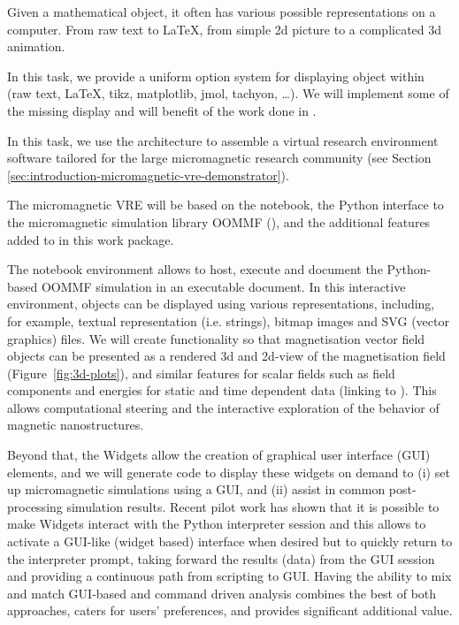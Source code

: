 \begin{workpackage}
\begin{tasklist}
\begin{task}[lead=UB,title=Common option system for various displays
  in Sage,id=Sage-display,PM=12,wphases=0-24]
  Given a mathematical object, it often has various possible
  representations on a computer. From raw text to \LaTeX, from simple
  2d picture to a complicated 3d animation.

  In this task, we provide a uniform option system for displaying
  object within \Sage (raw text, \LaTeX, tikz, matplotlib, jmol,
  tachyon, \ldots). We will implement some of the missing display and
  will benefit of the work done in .
\end{task}

\begin{task}[lead=USO,title=Case study: micromagnetic VRE built from
  \TheProject,id=oommf-py-ipython-attributes,PM=6,partners={SR,USH},wphases=9-15]

  In this task, we use the \TheProject architecture to assemble a
  virtual research environment software tailored for the large
  micromagnetic research community
  (see Section \ref{sec:introduction-micromagnetic-vre-demonstrator}).

  The micromagnetic VRE will be based on the \Jupyter notebook, the
  Python interface to the micromagnetic simulation library OOMMF
  (),
  and the additional features added to \Jupyter in this work
  package.

  The \Jupyter notebook environment allows to host, execute and
  document the Python-based OOMMF simulation in an executable
  document. In this interactive environment, objects can be displayed
  using various representations, including, for example, textual
  representation (i.e. strings), bitmap images and SVG (vector
  graphics) files. We will create functionality so that magnetisation
  vector field objects can be presented as a rendered 3d and 2d-view
  of the magnetisation field (Figure~\ref{fig:3d-plots}), and similar
  features for scalar fields such as field components and energies for
  static and time dependent data (linking to
  ). This allows computational steering and the
  interactive exploration of the behavior of magnetic nanostructures.

  Beyond that, the \Jupyter Widgets allow the creation of graphical
  user interface (GUI) elements, and we will generate code to display
  these widgets on demand to (i) set up micromagnetic simulations
  using a GUI, and (ii) assist in common post-processing simulation
  results. Recent pilot work has shown that it is possible to make
  \Jupyter Widgets interact with the Python interpreter session and
  this allows to activate a GUI-like (widget based) interface when
  desired but to quickly return to the interpreter prompt, taking
  forward the results (data) from the GUI session
  \cite{IPython-widget-GUI-demo-youtube-2014} and providing a
  continuous path from scripting to GUI. Having the ability to mix and
  match GUI-based and command driven analysis combines the best of
  both approaches, caters for users' preferences, and provides
  significant additional value.


\end{task}
\end{tasklist}
\end{workpackage}
